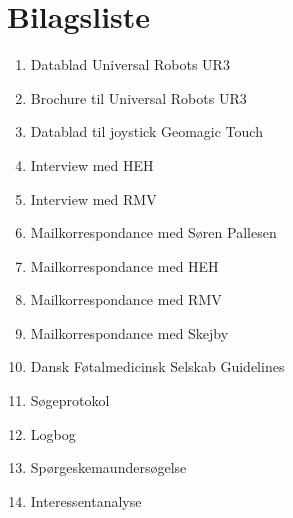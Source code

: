 \chapter{Bilagsliste}
\begin{enumerate}
\item Datablad Universal Robots UR3
\item Brochure til Universal Robots UR3
\item Datablad til joystick Geomagic Touch
\item Interview med HEH
\item Interview med RMV
\item Mailkorrespondance med Søren Pallesen
\item Mailkorrespondance med HEH
\item Mailkorrespondance med RMV
\item Mailkorrespondance med Skejby
\item Dansk Føtalmedicinsk Selskab Guidelines
\item Søgeprotokol
\item Logbog
\item Spørgeskemaundersøgelse
\item Interessentanalyse
\end{enumerate}
